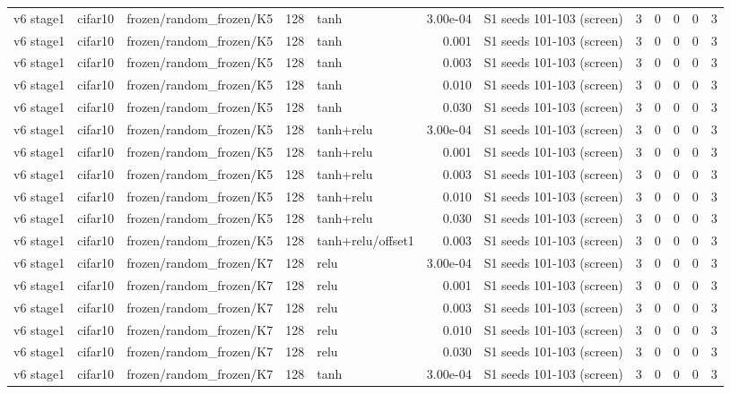 \begin{table}[htbp]
{\begin{tabular}{@{}lllrlrlrrrrr@{}}
v6 stage1 & cifar10 & frozen/random\_frozen/K5 & 128 & tanh & 3.00e-04 & S1 seeds 101-103 (screen) & 3 & 0 & 0 & 0 & 3 \\
v6 stage1 & cifar10 & frozen/random\_frozen/K5 & 128 & tanh & 0.001 & S1 seeds 101-103 (screen) & 3 & 0 & 0 & 0 & 3 \\
v6 stage1 & cifar10 & frozen/random\_frozen/K5 & 128 & tanh & 0.003 & S1 seeds 101-103 (screen) & 3 & 0 & 0 & 0 & 3 \\
v6 stage1 & cifar10 & frozen/random\_frozen/K5 & 128 & tanh & 0.010 & S1 seeds 101-103 (screen) & 3 & 0 & 0 & 0 & 3 \\
v6 stage1 & cifar10 & frozen/random\_frozen/K5 & 128 & tanh & 0.030 & S1 seeds 101-103 (screen) & 3 & 0 & 0 & 0 & 3 \\
v6 stage1 & cifar10 & frozen/random\_frozen/K5 & 128 & tanh+relu & 3.00e-04 & S1 seeds 101-103 (screen) & 3 & 0 & 0 & 0 & 3 \\
v6 stage1 & cifar10 & frozen/random\_frozen/K5 & 128 & tanh+relu & 0.001 & S1 seeds 101-103 (screen) & 3 & 0 & 0 & 0 & 3 \\
v6 stage1 & cifar10 & frozen/random\_frozen/K5 & 128 & tanh+relu & 0.003 & S1 seeds 101-103 (screen) & 3 & 0 & 0 & 0 & 3 \\
v6 stage1 & cifar10 & frozen/random\_frozen/K5 & 128 & tanh+relu & 0.010 & S1 seeds 101-103 (screen) & 3 & 0 & 0 & 0 & 3 \\
v6 stage1 & cifar10 & frozen/random\_frozen/K5 & 128 & tanh+relu & 0.030 & S1 seeds 101-103 (screen) & 3 & 0 & 0 & 0 & 3 \\
v6 stage1 & cifar10 & frozen/random\_frozen/K5 & 128 & tanh+relu/offset1 & 0.003 & S1 seeds 101-103 (screen) & 3 & 0 & 0 & 0 & 3 \\
v6 stage1 & cifar10 & frozen/random\_frozen/K7 & 128 & relu & 3.00e-04 & S1 seeds 101-103 (screen) & 3 & 0 & 0 & 0 & 3 \\
v6 stage1 & cifar10 & frozen/random\_frozen/K7 & 128 & relu & 0.001 & S1 seeds 101-103 (screen) & 3 & 0 & 0 & 0 & 3 \\
v6 stage1 & cifar10 & frozen/random\_frozen/K7 & 128 & relu & 0.003 & S1 seeds 101-103 (screen) & 3 & 0 & 0 & 0 & 3 \\
v6 stage1 & cifar10 & frozen/random\_frozen/K7 & 128 & relu & 0.010 & S1 seeds 101-103 (screen) & 3 & 0 & 0 & 0 & 3 \\
v6 stage1 & cifar10 & frozen/random\_frozen/K7 & 128 & relu & 0.030 & S1 seeds 101-103 (screen) & 3 & 0 & 0 & 0 & 3 \\
v6 stage1 & cifar10 & frozen/random\_frozen/K7 & 128 & tanh & 3.00e-04 & S1 seeds 101-103 (screen) & 3 & 0 & 0 & 0 & 3 \\

\end{tabular}}
\end{table}

